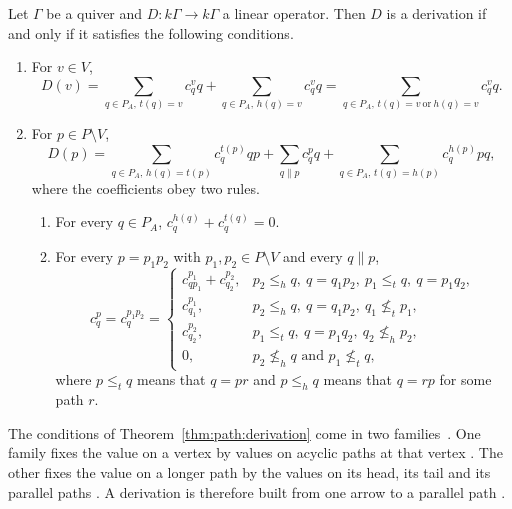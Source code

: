 \begin{theorem}\label{thm:path:derivation}
Let $\Gamma$ be a quiver and $D\colon k\Gamma\to k\Gamma$ a linear operator. Then
$D$ is a derivation if and only if it satisfies the following conditions.
\begin{enumerate}[label=(\alph*)]
\item For $v\in V$,
\begin{equation*}
D(v)=\sum_{q\in P_{A},\,t(q)=v}c^{v}_{q}q+\sum_{q\in P_{A},\,h(q)=v}c^{v}_{q}q
=\sum_{q\in P_{A},\,t(q)=v\ \text{or}\ h(q)=v}c^{v}_{q}q .
\end{equation*}
\item For $p\in P\setminus V$,
\begin{equation*}
D(p)=\sum_{q\in P_{A},\,h(q)=t(p)}c^{t(p)}_{q}qp
+\sum_{q\parallel p}c^{p}_{q}q
+\sum_{q\in P_{A},\,t(q)=h(p)}c^{h(p)}_{q}pq,
\end{equation*}
where the coefficients obey two rules.
\begin{enumerate}[label=(\roman*)]
\item For every $q\in P_{A}$, $c^{h(q)}_{q}+c^{t(q)}_{q}=0$.
\item For every $p=p_{1}p_{2}$ with $p_{1},p_{2}\in P\setminus V$ and every
$q\parallel p$,
\begin{equation*}
c^{p}_{q}=c^{p_{1}p_{2}}_{q}=
\begin{cases}
c^{p_{1}}_{qp_{1}}+c^{p_{2}}_{q_{2}},
  & p_{2}\le_{h}q,\ q=q_{1}p_{2},\ p_{1}\le_{t}q,\ q=p_{1}q_{2},\\
c^{p_{1}}_{q_{1}},
  & p_{2}\le_{h}q,\ q=q_{1}p_{2},\ q_{1}\not\le_{t}p_{1},\\
c^{p_{2}}_{q_{2}},
  & p_{1}\le_{t}q,\ q=p_{1}q_{2},\ q_{2}\not\le_{h}p_{2},\\
0, & p_{2}\not\le_{h}q\text{ and }p_{1}\not\le_{t}q,
\end{cases}
\end{equation*}
where $p\le_{t}q$ means that $q=pr$ and $p\le_{h}q$ means that $q=rp$ for some
path $r$.
\end{enumerate}
\end{enumerate}
\end{theorem}

The conditions of Theorem~\ref{thm:path:derivation} come in two families~\cite[pp.~553--554]{GuoLi2014}. One
family fixes the value on a vertex by values on acyclic paths at that vertex
\cite[p.~549]{GuoLi2014}. The other fixes the value on a longer path by the
values on its head, its tail and its parallel paths \cite[p.~549]{GuoLi2014}.
A derivation is therefore built from one arrow to a parallel path
\cite[pp.~553--554]{GuoLi2014}.

